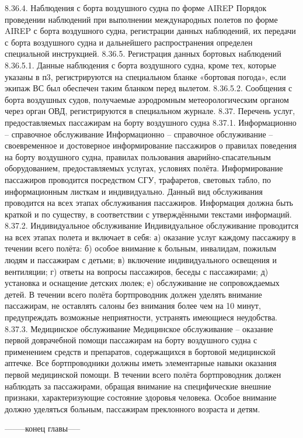 8.36.4.	Наблюдения с борта воздушного судна по форме AIREP
Порядок проведении наблюдений при выполнении международных полетов по форме AIREP с борта воздушного судна, регистрации данных наблюдений, их передачи с борта воздушного судна и дальнейшего распространения определен специальной инструкцией.
8.36.5.	Регистрация данных бортовых наблюдений
8.36.5.1. Данные наблюдения с борта воздушного судна, кроме тех, которые указаны в п3, регистрируются на специальном бланке «бортовая погода», если экипаж ВС был обеспечен таким бланком перед вылетом.
8.36.5.2. Сообщения с борта воздушных судов, получаемые аэродромным метеорологическим органом через орган ОВД, регистрируются в специальном журнале. 
8.37.	Перечень услуг, предоставляемых пассажирам на борту воздушного судна
8.37.1.	Информационно – справочное обслуживание
Информационно – справочное обслуживание – своевременное и достоверное информирование пассажиров о правилах поведения на борту воздушного судна, правилах пользования аварийно-спасательным оборудованием, предоставляемых услугах, условиях полёта. Информирование пассажиров проводится посредством СГУ, трафаретов, световых табло, по информационным листкам и индивидуально. Данный вид обслуживания проводится на всех этапах обслуживания пассажиров. Информация должна быть краткой и по существу, в соответствии с утверждёнными текстами информаций.
8.37.2.	Индивидуальное обслуживание
Индивидуальное обслуживание проводится на всех этапах полета и включает в себя:
а)	оказание услуг каждому пассажиру в течении всего полёта:
б)	особое внимание к больным, инвалидам, пожилым людям и пассажирам с детьми;
в)	включение индивидуального освещения и вентиляции;
г)	ответы на вопросы пассажиров, беседы с пассажирами;
д)	установка и оснащение детских люлек;
е)	обслуживание не сопровождаемых детей.
В течении всего полёта бортпроводник должен уделять внимание пассажирам, не оставлять салоны без внимания более чем на 10 минут, предупреждать возможные неприятности, устранять имеющиеся неудобства.
8.37.3.	Медицинское обслуживание
Медицинское обслуживание – оказание первой доврачебной помощи пассажирам на борту воздушного судна с применением средств и препаратов, содержащихся в бортовой медицинской аптечке. Все бортпроводники должны иметь элементарные навыки оказания первой медицинской помощи. В течении всего полёта бортпроводник должен наблюдать за пассажирами, обращая внимание на специфические внешние признаки, характеризующие состояние здоровья человека. Особое внимание должно уделяться больным, пассажирам преклонного возраста и детям.
                                  
                                                             --------конец главы-----
